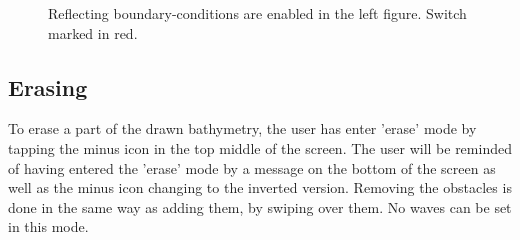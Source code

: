 \documentclass[11pt,a4paper]{article}
\begin{document}
\begin{figure}[H]
\vspace{2cm}
\caption{Reflecting boundary-conditions are enabled in the left figure. Switch marked in red.}
\end{figure}

\pagebreak
\subsection{Erasing}
To erase a part of the drawn bathymetry, the user has enter 'erase' mode by tapping the minus icon in the top middle of the screen. The user will be reminded of having entered the 'erase' mode by a message on the bottom of the screen as well as the minus icon changing to the inverted version. Removing the obstacles is done in the same way as adding them, by swiping over them. No waves can be set in this mode.
\end{document}
